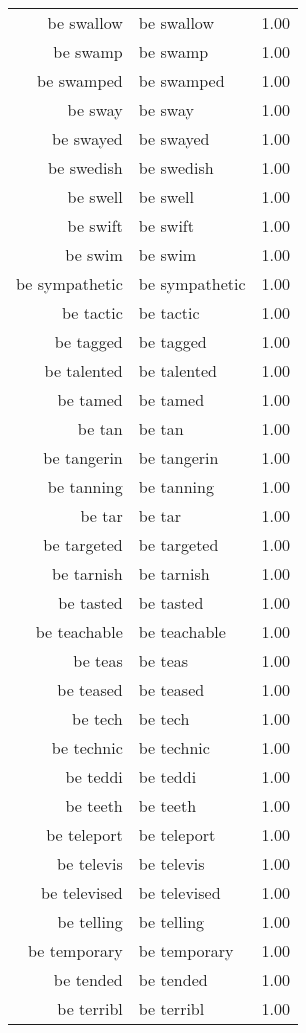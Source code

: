\begin{table}[ht]
\begin{tabular}{rlr}
  be swallow & be swallow & 1.00 \\ 
  be swamp & be swamp & 1.00 \\ 
  be swamped & be swamped & 1.00 \\ 
  be sway & be sway & 1.00 \\ 
  be swayed & be swayed & 1.00 \\ 
  be swedish & be swedish & 1.00 \\ 
  be swell & be swell & 1.00 \\ 
  be swift & be swift & 1.00 \\ 
  be swim & be swim & 1.00 \\ 
  be sympathetic & be sympathetic & 1.00 \\ 
  be tactic & be tactic & 1.00 \\ 
  be tagged & be tagged & 1.00 \\ 
  be talented & be talented & 1.00 \\ 
  be tamed & be tamed & 1.00 \\ 
  be tan & be tan & 1.00 \\ 
  be tangerin & be tangerin & 1.00 \\ 
  be tanning & be tanning & 1.00 \\ 
  be tar & be tar & 1.00 \\ 
  be targeted & be targeted & 1.00 \\ 
  be tarnish & be tarnish & 1.00 \\ 
  be tasted & be tasted & 1.00 \\ 
  be teachable & be teachable & 1.00 \\ 
  be teas & be teas & 1.00 \\ 
  be teased & be teased & 1.00 \\ 
  be tech & be tech & 1.00 \\ 
  be technic & be technic & 1.00 \\ 
  be teddi & be teddi & 1.00 \\ 
  be teeth & be teeth & 1.00 \\ 
  be teleport & be teleport & 1.00 \\ 
  be televis & be televis & 1.00 \\ 
  be televised & be televised & 1.00 \\ 
  be telling & be telling & 1.00 \\ 
  be temporary & be temporary & 1.00 \\ 
  be tended & be tended & 1.00 \\ 
  be terribl & be terribl & 1.00 \\ 

\end{tabular}
\end{table}
